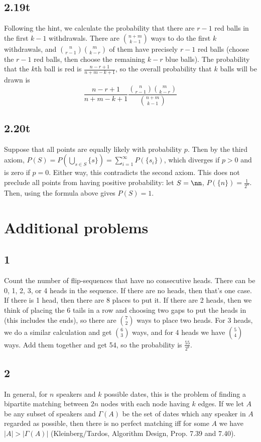 \documentclass{article}
\begin{document}
\subsection*{2.19t}
Following the hint, we calculate the probability that there are $r-1$ red balls in the first $k-1$ withdrawals. There are $\binom{n+m}{k-1}$ ways to do the first $k$ withdrawals, and $\binom{n}{r-1}\binom{m}{k-r}$ of them have precisely $r-1$ red balls (choose the $r-1$ red balls, then choose the remaining $k-r$ blue balls). The probability that the $k$th ball is red is $\frac{n-r+1}{n+m-k+1}$, so the overall probability that $k$ balls will be drawn is 
$$\frac{n-r+1}{n+m-k+1}\frac{\binom{n}{r-1}\binom{m}{k-r}}{\binom{n+m}{k-1}}$$
\subsection*{2.20t}
Suppose that all points are equally likely with probability $p$. Then by the third axiom, $P(S)=P(\bigcup_{s\in S}\{s\})=\sum_{i=1}^\infty P(\{s_i\})$, which diverges if $p>0$ and is zero if $p=0$. Either way, this contradicts the second axiom. This does not preclude all points from having positive probability: let $S=\nn$, $P(\{n\})=\frac{1}{2^n}$. Then, using the formula above gives $P(S)=1$.

\section*{Additional problems}
\subsection*{1}
Count the number of flip-sequences that have no consecutive heads. There can be 0, 1, 2, 3, or 4 heads in the sequence. If there are no heads, then that's one case. If there is 1 head, then there are 8 places to put it. If there are 2 heads, then we think of placing the 6 tails in a row and choosing two gaps to put the heads in (this includes the ends), so there are $\binom{7}{2}$ ways to place two heads. For 3 heads, we do a similar calculation and get $\binom{6}{3}$ ways, and for 4 heads we have $\binom{5}{4}$ ways. Add them together and get 54, so the probability is $\frac{55}{2^8}$.
\subsection*{2}
In general, for $n$ speakers and $k$ possible dates, this is the problem of finding a bipartite matching between $2n$ nodes with each node having $k$ edges. If we let $A$ be any subset of speakers and $\Gamma(A)$ be the set of dates which any speaker in $A$ regarded as possible, then there is no perfect matching iff for some $A$ we have $|A|>|\Gamma(A)|$ (Kleinberg/Tardos, Algorithm Design, Prop. 7.39 and 7.40). 
\end{document}
